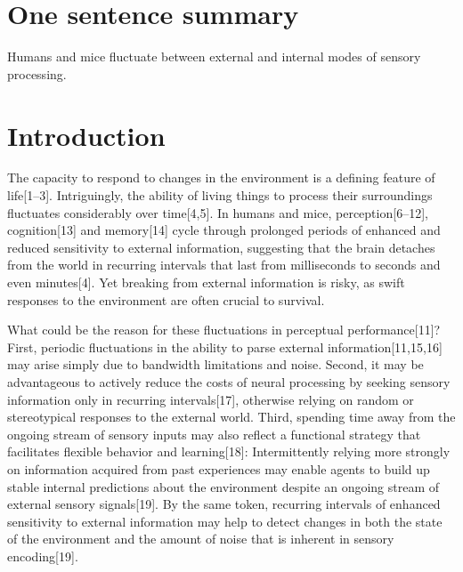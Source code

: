 \documentclass[
]{article}
\begin{document}
\hypertarget{one-sentence-summary}{%
\section{One sentence summary}\label{one-sentence-summary}}

Humans and mice fluctuate between external and internal modes of sensory
processing.

\hfill\break

\newpage

\hypertarget{introduction}{%
\section{Introduction}\label{introduction}}

The capacity to respond to changes in the environment is a defining
feature of life{[}1--3{]}. Intriguingly, the ability of living things to
process their surroundings fluctuates considerably over time{[}4,5{]}.
In humans and mice, perception{[}6--12{]}, cognition{[}13{]} and
memory{[}14{]} cycle through prolonged periods of enhanced and reduced
sensitivity to external information, suggesting that the brain detaches
from the world in recurring intervals that last from milliseconds to
seconds and even minutes{[}4{]}. Yet breaking from external information
is risky, as swift responses to the environment are often crucial to
survival.

What could be the reason for these fluctuations in perceptual
performance{[}11{]}? First, periodic fluctuations in the ability to
parse external information{[}11,15,16{]} may arise simply due to
bandwidth limitations and noise. Second, it may be advantageous to
actively reduce the costs of neural processing by seeking sensory
information only in recurring intervals{[}17{]}, otherwise relying on
random or stereotypical responses to the external world. Third, spending
time away from the ongoing stream of sensory inputs may also reflect a
functional strategy that facilitates flexible behavior and
learning{[}18{]}: Intermittently relying more strongly on information
acquired from past experiences may enable agents to build up stable
internal predictions about the environment despite an ongoing stream of
external sensory signals{[}19{]}. By the same token, recurring intervals
of enhanced sensitivity to external information may help to detect
changes in both the state of the environment and the amount of noise
that is inherent in sensory encoding{[}19{]}.
\end{document}
